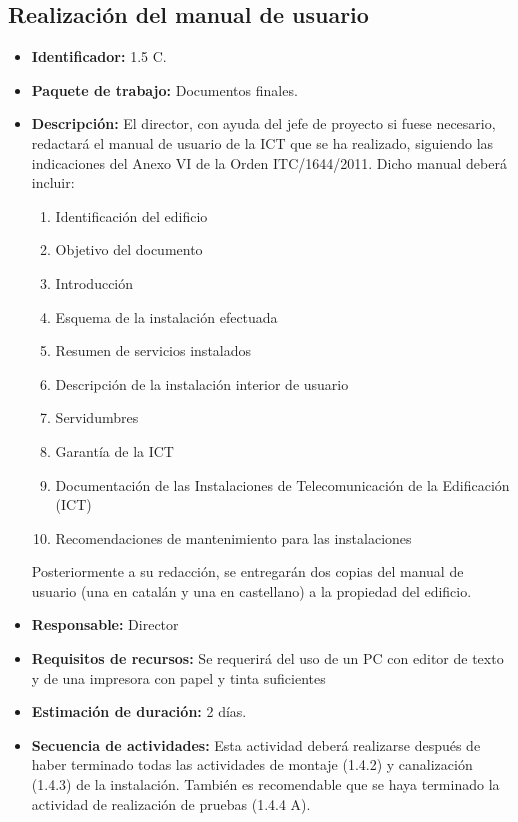 \subsection{Realización del manual de usuario}
\begin{itemize}
\item \textbf{Identificador: }1.5 C.
\item \textbf{Paquete de trabajo: }Documentos finales.
\item \textbf{Descripción: }El director, con ayuda del jefe de proyecto si fuese necesario, redactará el manual de usuario de la ICT que se ha realizado, siguiendo las indicaciones del Anexo VI de la Orden ITC/1644/2011. Dicho manual deberá incluir:
\begin{enumerate}
\item Identificación del edificio
\item Objetivo del documento
\item Introducción
\item Esquema de la instalación efectuada
\item Resumen de servicios instalados
\item Descripción de la instalación interior de usuario
\item Servidumbres
\item Garantía de la ICT
\item Documentación de las Instalaciones de Telecomunicación de la Edificación (ICT)
\item Recomendaciones de mantenimiento para las instalaciones
\end{enumerate}
Posteriormente a su redacción, se entregarán dos copias del manual de usuario (una en catalán y una en castellano) a la propiedad del edificio.
\item \textbf{Responsable: }Director
\item \textbf{Requisitos de recursos: }Se requerirá del uso de un PC con editor de texto y de una impresora con papel y tinta suficientes
\item \textbf{Estimación de duración: }2 días.
\item \textbf{Secuencia de actividades: }Esta actividad deberá realizarse después de haber terminado todas las actividades de montaje (1.4.2) y canalización (1.4.3) de la instalación. También es recomendable que se haya terminado la actividad de realización de pruebas (1.4.4 A).
\end{itemize}
